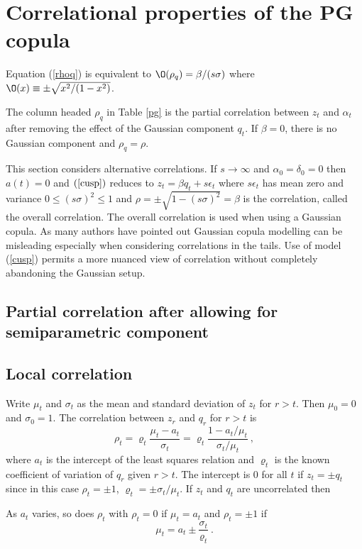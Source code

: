 \documentclass[authoryear]{elsarticle}
\newcommand{\eps}{\epsilon}
\newcommand{\eref}[1]{(\ref{#1})}
\newcommand{\tref}[1]{Table \ref{#1}}
\begin{document}
 \section{Correlational properties of the PG copula}
 
 Equation \eref{rhoq} is equivalent to  
$
\O(\rho_q) =\beta/(s\sigma)
$
where $\O(x) \equiv \pm\sqrt{x^2/(1-x^2)}$.
 
 The column headed $\rho_q$ in \tref{pg} is the partial correlation between $z_t$ and $\alpha_t$ after removing the effect of the Gaussian component $q_t$.  If $\beta=0$, there is no Gaussian component and $\rho_q=\rho$.
 
 This section considers alternative correlations.   If $s\rightarrow\infty$ and $\alpha_0=\delta_0=0$ then $a(t)=0$ and $\eref{cusp}$ reduces to $z_t=\beta q_t+s\eps_t$ where $s\eps_t$ has mean zero and variance $0\le (s\sigma)^2\le 1$ and $\rho=\pm\sqrt{1-(s\sigma)^2}=\beta$ is the correlation, called the overall correlation.  The overall correlation is used when using a Gaussian copula.
As many authors have pointed out Gaussian copula modelling can be misleading especially when considering correlations in the tails.
Use of model \eref{cusp} permits a more nuanced view of correlation without completely abandoning the Gaussian setup.

\subsection{Partial correlation after allowing for semiparametric component}
 

\subsection{Local correlation}

Write  $\mu_t$ and  $\sigma_t$ as the mean and standard deviation of $z_t$ for $r>t$.   Then $\mu_0=0$ and $\sigma_0=1$.   The correlation between $z_r$ and $q_r$ for $r>t$ is
$$
\rho_t= \varrho_t \frac{\mu_t-a_t}{\sigma_t}= \varrho_t \frac{1-a_t/\mu_t}{\sigma_t/\mu_t}\ ,
$$
where $a_t$ is the intercept of the least squares relation and  $\varrho_t$ is the  known coefficient of variation of $q_r$ given $r>t$.   The intercept is 0 for all $t$ if $z_t=\pm q_t$ since in this case  $\rho_t=\pm 1$, $\varrho_t=\pm \sigma_t/\mu_t$.  If $z_t$ and $q_t$ are uncorrelated then 



  As $a_t$ varies, so does $\rho_t$ with $\rho_t=0$ if $\mu_t=a_t$ and $\rho_t=\pm 1$ if  
$$
\mu_t= a_t \pm \frac{\sigma_t}{\varrho_t} \ .
$$
\end{document}

